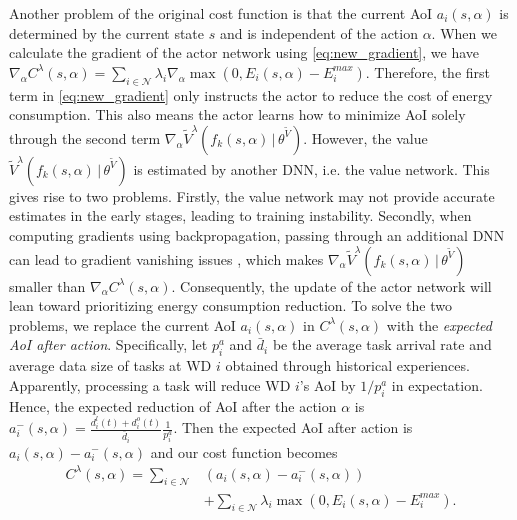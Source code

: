\documentclass[lettersize, journal]{IEEEtran}
\begin{document}
Another problem of the original cost function is that the current AoI $a_i(s,\alpha)$ is determined by the current state $s$
and is independent of the action $\alpha$.
When we calculate the gradient of the actor network using \eqref{eq:new_gradient},
we have $\nabla_{\alpha} C^{\lambda}(s,\alpha) = \sum_{i\in\mathcal{N}} \lambda_i \nabla_{\alpha} \max(0, E_i(s,\alpha) - E^{max}_i)$.
Therefore, the first term in \eqref{eq:new_gradient} only instructs the actor to reduce the cost of energy consumption.
This also means the actor learns how to minimize AoI solely through the second term
$\nabla_{\alpha} \tilde{V}^{\lambda}(f_k(s,\alpha) \, | \, \theta^{\tilde{V}})$.
However, the value $\tilde{V}^{\lambda}(f_k(s,\alpha) \, | \, \theta^{\tilde{V}})$ is estimated by another DNN, i.e. the value network.
This gives rise to two problems.
Firstly, the value network may not provide accurate estimates in the early stages, leading to training instability.
Secondly, when computing gradients using backpropagation, passing through an additional DNN can lead to gradient vanishing issues \cite{hochreiter1998vanishing}, which makes $\nabla_{\alpha} \tilde{V}^{\lambda}(f_k(s,\alpha) \, | \, \theta^{\tilde{V}})$
smaller than $\nabla_{\alpha} C^{\lambda}(s,\alpha)$.
Consequently, the update of the actor network will lean toward prioritizing energy consumption reduction.
To solve the two problems, we replace the current AoI $a_i(s, \alpha)$ in $C^{\lambda}(s,\alpha)$
with the \emph{expected AoI after action}.
Specifically, let $p^a_i$ and $\bar{d}_i$ be the average task arrival rate and average data size of tasks at WD $i$
obtained through historical experiences.
Apparently, processing a task will reduce WD $i$'s AoI by $1/p^a_i$ in expectation.
Hence, the expected reduction of AoI after the action $\alpha$ is $a^-_i(s, \alpha) = \frac{d^l_i(t)+d^o_i(t)}{\bar{d}_i} \frac{1}{p^a_i}$.
Then the expected AoI after action is $a_i(s,\alpha) - a^-_i(s,\alpha)$ and our cost function becomes
\begin{align*}
  C^{\lambda}(s, \alpha) = \sum_{i\in\mathcal{N}} &\left( a_i(s,\alpha) - a^-_i(s,\alpha) \right) \\
                         &+ \sum_{i\in\mathcal{N}} \lambda_i \max\left(0, E_i(s,\alpha) - E^{max}_i \right).
\end{align*}
\end{document}
